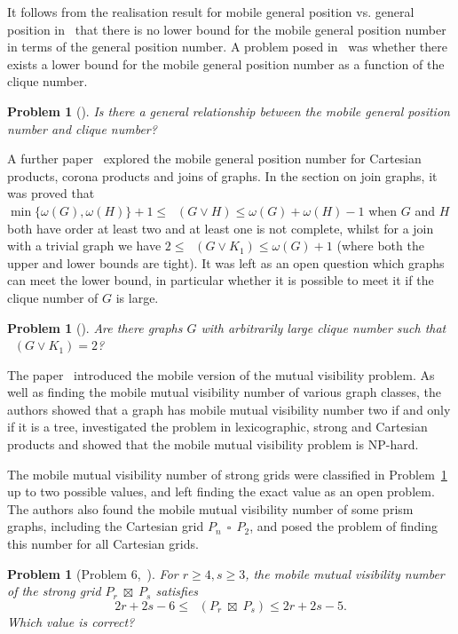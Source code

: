 \documentclass[a4paper,12pt]{article}
\DeclareMathOperator{\strongprod}{\,\boxtimes\,}
\DeclareMathOperator{\mob}{Mob_{gp}}
\DeclareMathOperator{\mobmv}{Mob_{\mu}}
\DeclareMathOperator{\cp}{\,\square\,}
\newtheorem{problem}[theorem]{Problem}
\theoremstyle{definition}
\begin{document}
	It follows from the realisation result for mobile general position vs. general position in~\cite{klavzar-2023} that there is no lower bound for the mobile general position number in terms of the general position number. A problem posed in~\cite{klavzar-2023} was whether there exists a lower bound for the mobile general position number as a function of the clique number.
	
	\begin{problem}[\cite{klavzar-2023}]\label{prob:mob gp vs clique num}
		Is there a general relationship between the mobile general position number and
		clique number?
	\end{problem}
	
	A further paper~\cite{Cartesian} explored the mobile general position number for Cartesian products, corona products and joins of graphs. In the section on join graphs, it was proved that $\min \{ \omega(G),\omega (H)\} +1 \leq \mob (G \vee H) \leq \omega (G)+\omega (H)-1$ when $G$ and $H$ both have order at least two and at least one is not complete, whilst for a join with a trivial graph we have $2 \leq \mob (G \vee K_1) \leq \omega (G)+1$ (where both the upper and lower bounds are tight). It was left as an open question which graphs can meet the lower bound, in particular whether it is possible to meet it if the clique number of $G$ is large. 
	
	\begin{problem}[\cite{Cartesian}]\label{prob:join}
		Are there graphs $G$ with arbitrarily large clique number such that $\mob (G \vee K_1) = 2$?   
	\end{problem}
	
	The paper~\cite{dettlaff2024} introduced the mobile version of the mutual visibility problem. As well as finding the mobile mutual visibility number of various graph classes, the authors showed that a graph has mobile mutual visibility number two if and only if it is a tree, investigated the problem in lexicographic, strong and Cartesian products and showed that the mobile mutual visibility problem is NP-hard.
	
	The mobile mutual visibility number of strong grids were classified in Problem~\ref{prob:strong grids} up to two possible values, and left finding the exact value as an open problem. The authors also found the mobile mutual visibility number of some prism graphs, including the Cartesian grid $P_n \cp P_2$, and posed the problem of finding this number for all Cartesian grids.  
	
	\begin{problem}[Problem 6,~\cite{dettlaff2024}]\label{prob:strong grids}
		For $r \geq 4, s \geq 3$, the mobile mutual visibility number of the strong grid $P_r \strongprod P_s$ satisfies \[ 2r+2s-6 \leq \mobmv(P_r \strongprod P_s) \leq 2r+2s-5.\] Which value is correct?
	\end{problem}
	
\end{document}
